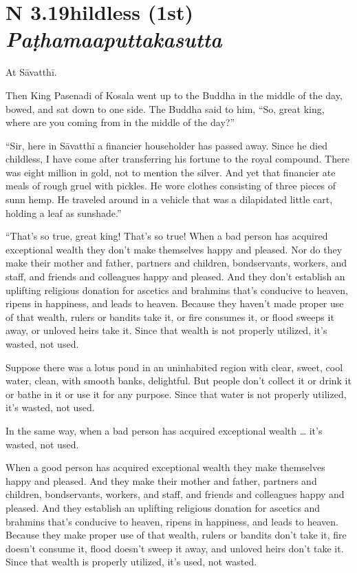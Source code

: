 \documentclass[12pt,openany]{book}%
\newcommand*{\suttatitleacronym}[1]{\smaller[2]{#1}\vspace*{.3em}}
\newcommand*{\suttatitletranslation}[1]{\linebreak{#1}}
\newcommand*{\suttatitleroot}[1]{\linebreak\smaller[2]\itshape{#1}}
\newcommand*{\tocacronym}[1]{\hspace*{-3.3em}{#1}\quad}
\newcommand*{\toctranslation}[1]{#1}
\newcommand*{\tocroot}[1]{(\textit{#1})}
\begin{document}
%
\section*{{\suttatitleacronym SN 3.19}{\suttatitletranslation Childless (1st) }{\suttatitleroot Paṭhamaaputtakasutta}}
\addcontentsline{toc}{section}{\tocacronym{SN 3.19} \toctranslation{Childless (1st) } \tocroot{Paṭhamaaputtakasutta}}

At \textsanskrit{Sāvatthī}. 

Then King Pasenadi of Kosala went up to the Buddha in the middle of the day, bowed, and sat down to one side. The Buddha said to him, “So, great king, where are you coming from in the middle of the day?” 

“Sir, here in \textsanskrit{Sāvatthī} a financier householder has passed away. Since he died childless, I have come after transferring his fortune to the royal compound. There was eight million in gold, not to mention the silver. And yet that financier ate meals of rough gruel with pickles. He wore clothes consisting of three pieces of sunn hemp. He traveled around in a vehicle that was a dilapidated little cart, holding a leaf as sunshade.” 

“That’s so true, great king! That’s so true! When a bad person has acquired exceptional wealth they don’t make themselves happy and pleased. Nor do they make their mother and father, partners and children, bondservants, workers, and staff, and friends and colleagues happy and pleased. And they don’t establish an uplifting religious donation for ascetics and brahmins that’s conducive to heaven, ripens in happiness, and leads to heaven. Because they haven’t made proper use of that wealth, rulers or bandits take it, or fire consumes it, or flood sweeps it away, or unloved heirs take it. Since that wealth is not properly utilized, it’s wasted, not used. 

Suppose there was a lotus pond in an uninhabited region with clear, sweet, cool water, clean, with smooth banks, delightful. But people don’t collect it or drink it or bathe in it or use it for any purpose. Since that water is not properly utilized, it’s wasted, not used. 

In the same way, when a bad person has acquired exceptional wealth … it’s wasted, not used. 

When a good person has acquired exceptional wealth they make themselves happy and pleased. And they make their mother and father, partners and children, bondservants, workers, and staff, and friends and colleagues happy and pleased. And they establish an uplifting religious donation for ascetics and brahmins that’s conducive to heaven, ripens in happiness, and leads to heaven. Because they make proper use of that wealth, rulers or bandits don’t take it, fire doesn’t consume it, flood doesn’t sweep it away, and unloved heirs don’t take it. Since that wealth is properly utilized, it’s used, not wasted. 
\end{document}
